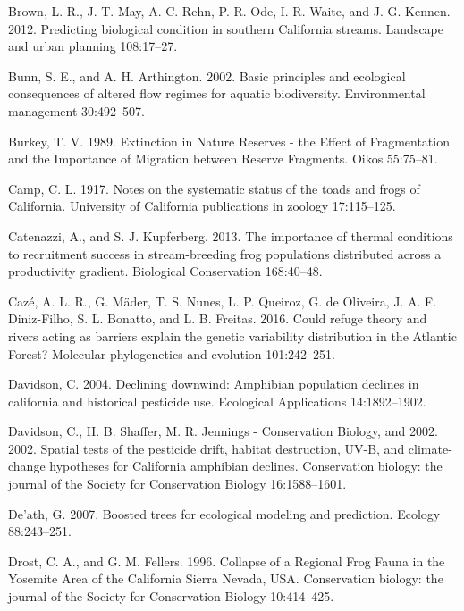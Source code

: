 \documentclass[proquest,12pt,final]{ucthesis-CA2012} %
\begin{document}
\begin{ucmainmatter}
\leavevmode\hypertarget{ref-brown_predicting_2012}{}%
Brown, L. R., J. T. May, A. C. Rehn, P. R. Ode, I. R. Waite, and J. G.
Kennen. 2012. Predicting biological condition in southern California
streams. Landscape and urban planning 108:17--27.

\leavevmode\hypertarget{ref-bunn_basic_2002}{}%
Bunn, S. E., and A. H. Arthington. 2002. Basic principles and ecological
consequences of altered flow regimes for aquatic biodiversity.
Environmental management 30:492--507.

\leavevmode\hypertarget{ref-burkey_extinction_1989}{}%
Burkey, T. V. 1989. Extinction in Nature Reserves - the Effect of
Fragmentation and the Importance of Migration between Reserve Fragments.
Oikos 55:75--81.

\leavevmode\hypertarget{ref-camp_notes_1917}{}%
Camp, C. L. 1917. Notes on the systematic status of the toads and frogs
of California. University of California publications in zoology
17:115--125.

\leavevmode\hypertarget{ref-catenazzi_importance_2013}{}%
Catenazzi, A., and S. J. Kupferberg. 2013. The importance of thermal
conditions to recruitment success in stream-breeding frog populations
distributed across a productivity gradient. Biological Conservation
168:40--48.

\leavevmode\hypertarget{ref-caze_could_2016}{}%
Cazé, A. L. R., G. Mäder, T. S. Nunes, L. P. Queiroz, G. de Oliveira, J.
A. F. Diniz-Filho, S. L. Bonatto, and L. B. Freitas. 2016. Could refuge
theory and rivers acting as barriers explain the genetic variability
distribution in the Atlantic Forest? Molecular phylogenetics and
evolution 101:242--251.

\leavevmode\hypertarget{ref-davidson_declining_2004}{}%
Davidson, C. 2004. Declining downwind: Amphibian population declines in
california and historical pesticide use. Ecological Applications
14:1892--1902.

\leavevmode\hypertarget{ref-davidson_spatial_2002}{}%
Davidson, C., H. B. Shaffer, M. R. Jennings - Conservation Biology, and
2002. 2002. Spatial tests of the pesticide drift, habitat destruction,
UV-B, and climate-change hypotheses for California amphibian declines.
Conservation biology: the journal of the Society for Conservation
Biology 16:1588--1601.

\leavevmode\hypertarget{ref-death_boosted_2007}{}%
De'ath, G. 2007. Boosted trees for ecological modeling and prediction.
Ecology 88:243--251.

\leavevmode\hypertarget{ref-drost_collapse_1996}{}%
Drost, C. A., and G. M. Fellers. 1996. Collapse of a Regional Frog Fauna
in the Yosemite Area of the California Sierra Nevada, USA. Conservation
biology: the journal of the Society for Conservation Biology
10:414--425.


\end{ucmainmatter}
\end{document}
